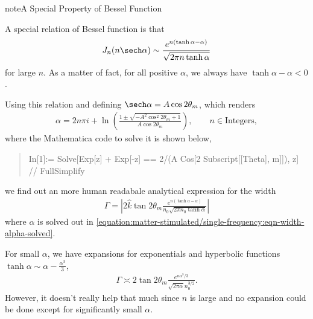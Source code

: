 \documentclass[letterpaper,12pt,english]{sphinxmanual}
\begin{document}
\begin{sphinxadmonition}{note}{A Special Property of Bessel Function}

A special relation of Bessel function is that \label{\detokenize{matter-stimulated/single-frequency:id1}}{\hyperref[\detokenize{matter-stimulated/single-frequency:ploumistakis2009}]{\sphinxcrossref{{[}Ploumistakis2009{]}}}}
\begin{equation*}
\begin{split}J_n(n \sech \alpha) \sim \frac{ e^{n(\tanh\alpha - \alpha)} }{\sqrt{ 2\pi n \tanh \alpha } }\end{split}
\end{equation*}
for large \(n\). As a matter of fact, for all positive \(\alpha\), we always have \(\tanh \alpha - \alpha < 0\).

Using this relation and defining \(\sech \alpha = A \cos 2\theta_m\), which renders
\label{\detokenize{matter-stimulated/single-frequency:equation-eqn-width-alpha-solved}}\begin{equation}\label{equation:matter-stimulated/single-frequency:eqn-width-alpha-solved}
\begin{split}\alpha = 2 n \pi i + \ln \left(  \frac{ 1 \pm \sqrt{ -A^2 \cos^2 2\theta_m + 1 } }{ A\cos 2\theta_m } \right),\qquad n\in \mathrm{Integers},\end{split}
\end{equation}
where the Mathematica code to solve it is shown below,
\begin{quote}

In{[}1{]}:= Solve{[}Exp{[}z{]} + Exp{[}-z{]} == 2/(A Cos{[}2 Subscript{[}{[}Theta{]}, m{]}{]}), z{]} // FullSimplify
\end{quote}

we find out an more human readabale analytical expression for the width
\begin{equation*}
\begin{split}\Gamma = \left\lvert 2 \hat k \tan 2\theta_m \frac{ e^{n ( \tanh \alpha - \alpha )} }{n_0 \sqrt{2\pi n_0 \tanh \alpha} } \right\rvert\end{split}
\end{equation*}
where \(\alpha\) is solved out in \eqref{equation:matter-stimulated/single-frequency:eqn-width-alpha-solved}.

For small \(\alpha\), we have expansions for exponentials and hyperbolic functions \(\tanh \alpha \sim \alpha - \frac{\alpha^3}{3}\),
\begin{equation*}
\begin{split}\Gamma \asymp 2\tan 2\theta_m \frac{ e^{n \alpha^3/3} }{\sqrt{2\pi \alpha} n_0^{3/2}  }.\end{split}
\end{equation*}
However, it doesn't really help that much since \(n\) is large and no expansion could be done except for significantly small \(\alpha\).
\end{sphinxadmonition}
\end{document}
